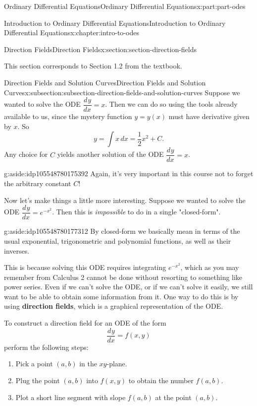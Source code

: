 \documentclass[oneside,10pt,]{book}
\newcommand{\terminology}[1]{\textbf{#1}}
\numberwithin{equation}{part}
\newcommand{\dv}[3][]{\dfrac{d^{#1} #2}{d #3^{#1}}}
\begin{document}
\begin{partptx}{Ordinary Differential Equations}{}{Ordinary Differential Equations}{}{}{x:part:part-odes}
\begin{chapterptx}{Introduction to Ordinary Differential Equations}{}{Introduction to Ordinary Differential Equations}{}{}{x:chapter:intro-to-odes}
\begin{sectionptx}{Direction Fields}{}{Direction Fields}{}{}{x:section:section-direction-fields}
\begin{introduction}{}
This section corresponds to Section 1.2 from the textbook.%
\end{introduction}%
%
%
\typeout{************************************************}
\typeout{************************************************}
%
\begin{subsectionptx}{Direction Fields and Solution Curves}{}{Direction Fields and Solution Curves}{}{}{x:subsection:subsection-direction-fields-and-solution-curves}
Suppose we wanted to solve the ODE \(\dv{y}{x} = x\). Then we can do so using the tools already available to us, since the mystery function \(y=y(x)\) must have derivative given by \(x\). So%
\begin{equation*}
y = \int x\,dx = \frac{1}{2}x^{2}+C.
\end{equation*}
Any choice for \(C\) yields another solution of the ODE \(\dv{y}{x} = x\).%
\begin{aside}{}{g:aside:idp105548780175392}%
Again, it's very important in this course not to forget the arbitrary constant \(C\)!%
\end{aside}
Now let's make things a little more interesting. Suppose we wanted to solve the ODE \(\dv{y}{x} = e^{-x^{2}}\). Then this is \emph{impossible} to do in a single "closed-form". \begin{aside}{}{g:aside:idp105548780177312}%
By closed-form we basically mean in terms of the usual exponential, trigonometric and polynomial functions, as well as their inverses.%
\end{aside}
 This is because solving this ODE requires integrating \(e^{-x^{2}}\), which as you may remember from Calculus 2 cannot be done without resorting to something like power series. Even if we can't solve the ODE, or if we can't solve it easily, we still want to be able to obtain some information from it. One way to do this is by using \terminology{direction fields}, which is a graphical representation of the ODE.%
\par
To construct a direction field for an ODE of the form%
\begin{equation*}
\dv{y}{x} = f(x,y)
\end{equation*}
perform the following steps:%
\begin{enumerate}
\item{}Pick a point \((a,b)\) in the \(xy\)-plane.%
\item{}Plug the point \((a,b)\) into \(f(x,y)\) to obtain the number \(f(a,b)\).%
\item{}Plot a short line segment with slope \(f(a,b)\) at the point \((a,b)\).%

\end{enumerate}
\end{subsectionptx}
\end{sectionptx}
\end{chapterptx}
\end{partptx}
\end{document}
